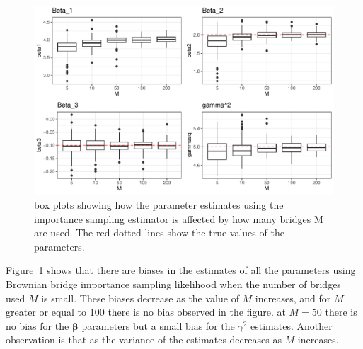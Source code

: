 \begin{figure}[H]
    \centering
    \includegraphics[width=\linewidth]{Images/Results/varying M estimates boxplot BB.pdf}
    \caption[Box plots of Parameter Estimates using Brownian bridge importance sampling using different numbers of bridges]{box plots showing how the parameter estimates using the importance sampling estimator is affected by how many bridges M are used. The red dotted lines show the true values of the parameters.}
    \label{fig:varying M boxplots brownian bridge}
\end{figure}

Figure~\ref{fig:varying M boxplots brownian bridge} shows that there are biases in the estimates of all the parameters using Brownian bridge importance sampling likelihood when the number of bridges used $M$ is small. These biases decrease as the value of $M$ increases, and for $M$ greater or equal to 100 there is no bias observed in the figure. at $M =50$ there is no bias for the $\bm \beta$ parameters but a small bias for the $\gamma^2$ estimates. Another observation is that as the variance of the estimates decreases as $M$ increases.



